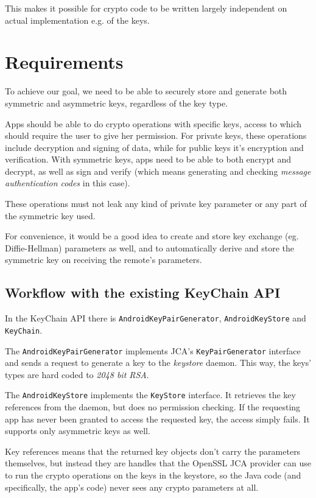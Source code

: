\documentclass[a4paper,draft]{scrartcl}
\begin{document}
		This makes it possible for crypto code to be written largely independent on actual implementation
		e.g. of the keys.

	\section{Requirements}
		To achieve our goal, we need to be able to securely store and generate both symmetric and asymmetric
		keys, regardless of the key type.

		Apps should be able to do crypto operations with specific keys, access to which should require the user
		to give her permission. For private keys, these operations include decryption and signing of data, while
		for public keys it's encryption and verification. With symmetric keys, apps need to be able to both
		encrypt and decrypt, as well as sign and verify (which means generating and checking {\em message
		authentication codes} in this case).

		These operations must not leak any kind of private key parameter or any part of the symmetric key used.

		For convenience, it would be a good idea to create and store key exchange (eg. Diffie-Hellman) parameters
		as well, and to automatically derive and store the symmetric key on receiving the remote's parameters.

	\subsection{Workflow with the existing KeyChain API}
		In the KeyChain API there is \texttt{AndroidKeyPairGenerator}, \texttt{AndroidKeyStore} and \linebreak \texttt{KeyChain}.

		The \texttt{AndroidKeyPairGenerator} implements JCA's \texttt{KeyPairGenerator} interface and sends a request
		to generate a key to the {\em keystore} daemon. This way, the keys' types are hard coded to {\em 2048 bit RSA}.
		
		The \texttt{AndroidKeyStore} implements the \texttt{KeyStore} interface. It retrieves the key references from
		the daemon, but does no permission checking. If the requesting app has never been granted to access the requested
		key, the access simply fails. It supports only asymmetric keys as well.

		Key references means that the returned key objects don't carry the parameters themselves, but instead they are
		handles that the OpenSSL JCA provider can use to run the crypto operations on the keys in the keystore, so the
		Java code (and specifically, the app's code) never sees any crypto parameters at all.
\end{document}
